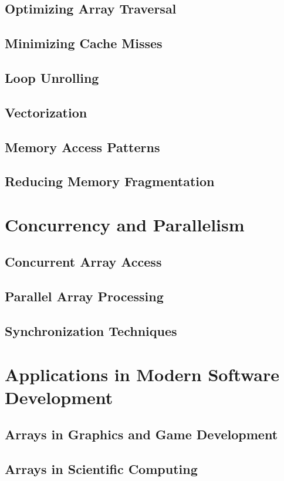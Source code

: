 \documentclass[12pt, oneside]{book}
\begin{document}
	\section{Optimizing Array Traversal}
	\section{Minimizing Cache Misses}
	\section{Loop Unrolling}
	\section{Vectorization}
	\section{Memory Access Patterns}
	\section{Reducing Memory Fragmentation}
	
	\chapter{Concurrency and Parallelism}
	\section{Concurrent Array Access}
	\section{Parallel Array Processing}
	\section{Synchronization Techniques}
	
	\chapter{Applications in Modern Software Development}
	\section{Arrays in Graphics and Game Development}
	\section{Arrays in Scientific Computing}
\end{document}
